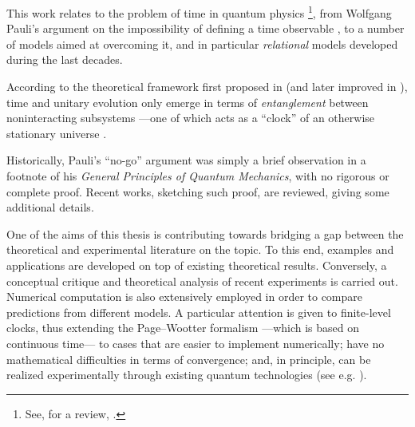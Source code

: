 This work relates to the problem of time in quantum physics%
\footnote{
  See, for a review, \cite{TQM1, TQM2}.
},
from Wolfgang Pauli's argument
on the impossibility of defining a time observable \parencite{PauliFootnote},
to a number of models aimed at overcoming it,
and in particular \emph{relational} models
developed during the last decades.

According to the theoretical framework first proposed in \cite{PageWootters}
(and later improved in \cite{Lloyd:Time}),
time and unitary evolution only emerge in
terms of \emph{entanglement} between noninteracting subsystems
---one of which acts as a ``clock''
of an otherwise stationary universe \parencite{Marletto:Evolution}.

Historically, Pauli's ``no-go'' argument was simply a brief observation in a footnote
of his \textit{General Principles of Quantum Mechanics},
with no rigorous or complete proof. Recent works, sketching such proof, are
reviewed, giving some additional details.

One of the aims of this thesis
is contributing towards bridging a gap between the theoretical
and experimental literature on the topic.
To this end, examples and applications are developed on top of existing theoretical results.  
Conversely,
a conceptual critique and theoretical analysis
of recent experiments is carried out.
Numerical computation is also extensively employed in order to compare
predictions from different models. A particular attention is given
to finite-level clocks,
thus extending the Page--Wootter formalism ---which is based on continuous time---
to cases that are easier to implement numerically;
have no mathematical difficulties in terms of convergence;
and, in principle, can be realized experimentally through existing quantum technologies
(see e.g. \cite{FiniteHilb}). 